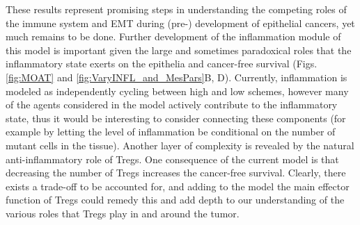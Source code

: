 \documentclass[11pt]{article}
\begin{document}
These results represent promising steps in understanding the competing roles of the immune system and EMT during (pre-) development of epithelial cancers, yet much remains to be done. Further development of the inflammation module of this model is important given the large and sometimes paradoxical roles that the inflammatory state exerts on the epithelia and cancer-free survival (Figs. \ref{fig:MOAT} and \ref{fig:VaryINFL_and_MesPars}B, D). Currently, inflammation is modeled as independently cycling between high and low schemes, however many of the agents considered in the model actively contribute to the inflammatory state, thus it would be interesting to consider connecting these components (for example by letting the level of inflammation be conditional on the number of mutant cells in the tissue). Another layer of complexity is revealed by the natural anti-inflammatory role of Tregs. One consequence of the current model is that decreasing the number of Tregs increases the cancer-free survival. Clearly, there exists a trade-off to be accounted for, and adding to the model the main effector function of Tregs could remedy this and add depth to our understanding of the various roles that Tregs play in and around the tumor.
\end{document}
